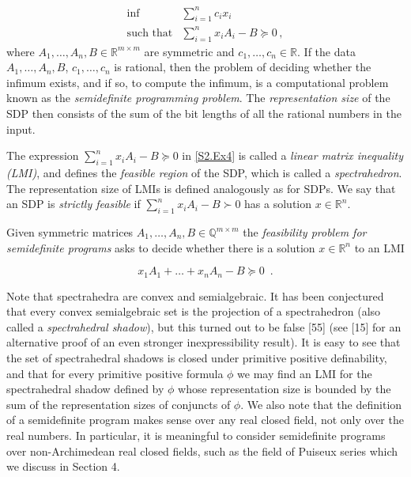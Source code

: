 \begin{equation}\tag{P}\label{S2.Ex4}
\begin{aligned}
\displaystyle\inf & \displaystyle\sum_{i=1}^{n}c_{i}x_{i} \\
\text{such that} & \displaystyle\sum_{i=1}^{n}x_{i}A_{i}-B\succeq 0\,,
\end{aligned}
\end{equation}
where $A_{1},\dots,A_{n},B\in{\mathbb{R}}^{m\times m}$ are symmetric and $c_{1},\dots,c_{n}\in{\mathbb{R}}$. If the data $A_{1},\dots,A_{n},B$, $c_{1},\dots,c_{n}$ is rational, then the problem of deciding whether the infimum exists, and if so, to compute the infimum, is a computational problem known as the \emph{semidefinite programming problem}. The \emph{representation size} of the SDP then consists of the sum of the bit lengths of all the rational numbers in the input.

The expression $\sum_{i=1}^{n}x_{i}A_{i}-B\succeq 0$ in \eqref{S2.Ex4} is called a \emph{linear matrix inequality (LMI)}, and defines the \emph{feasible region} of the SDP, which is called a \emph{spectrahedron}. The representation size of LMIs is defined analogously as for SDPs. We say that an SDP is \emph{strictly feasible} if $\sum_{i=1}^{n}x_{i}A_{i}-B\succ 0$ has a solution $x\in{\mathbb{R}}^{n}$.

\setcounter{theorem}{0}
\begin{definition}\label{Thmtheorem1}
Given symmetric matrices $A_{1},\dots,A_{n},B\in{\mathbb{Q}}^{m\times m}$ the \emph{feasibility problem for semidefinite programs} asks to decide whether there is a solution $x\in\mathbb{R}^{n}$ to an LMI


\[
x_{1}A_{1}+\dots+x_{n}A_{n}-B\succeq 0\enspace.
\]
\end{definition}

Note that spectrahedra are convex and semialgebraic. It has been conjectured that every convex semialgebraic set is the projection of a spectrahedron (also called a \emph{spectrahedral shadow}), but this turned out to be false [55] (see [15] for an alternative proof of an even stronger inexpressibility result). It is easy to see that the set of spectrahedral shadows is closed under primitive positive definability, and that for every primitive positive formula $\phi$ we may find an LMI for the spectrahedral shadow defined by $\phi$ whose representation size is bounded by the sum of the representation sizes of conjuncts of $\phi$. We also note that the definition of a semidefinite program makes sense over any real closed field, not only over the real numbers. In particular, it is meaningful to consider semidefinite programs over non-Archimedean real closed fields, such as the field of Puiseux series which we discuss in Section 4.


